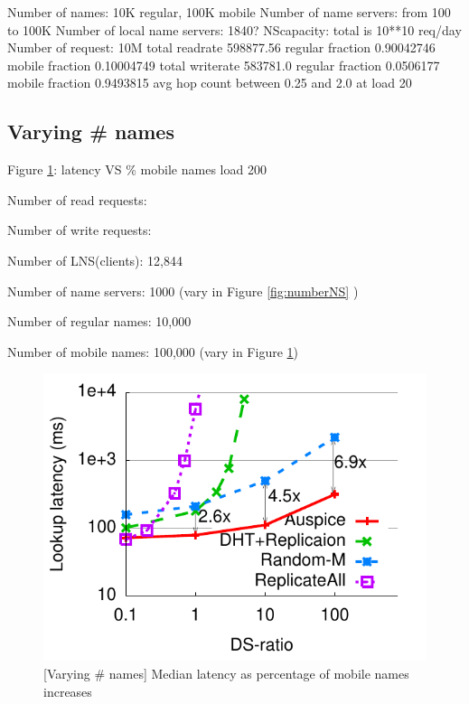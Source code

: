 Number of names: 10K regular, 100K mobile
Number of name servers: from 100 to 100K
Number of local name servers: 1840?
NScapacity: total is 10**10 req/day
Number of request: 10M
total readrate 598877.56 regular fraction 0.90042746 mobile fraction 0.10004749
total writerate 583781.0 regular fraction 0.0506177 mobile fraction 0.9493815
avg hop count between 0.25 and 2.0
at load 20 

\subsection{Varying \# names}
\label{sim:numname}

Figure \ref{fig:percentmobile}: latency VS \% mobile names
load 200

Number of read requests: 

Number of write requests:

Number of LNS(clients): 12,844

Number of name servers: 1000 (vary in Figure \ref{fig:numberNS} )

Number of regular names: 10,000

Number of mobile names: 100,000 (vary in Figure \ref{fig:percentmobile})




\begin{figure}[t]
\centering
\includegraphics[scale=0.5]{graph/medianlatencyVSnummobile.pdf}
\caption{[Varying \# names] Median latency as percentage of mobile names increases}
\label{fig:percentmobile}
\end{figure}

